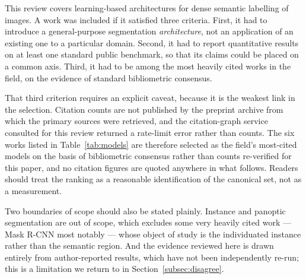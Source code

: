 \documentclass[journal]{IEEEtran}
\begin{document}
This review covers learning-based architectures for dense semantic labelling of
images. A work was included if it satisfied three criteria. First, it had to
introduce a general-purpose segmentation \emph{architecture}, not an application of
an existing one to a particular domain. Second, it had to report quantitative results
on at least one standard public benchmark, so that its claims could be placed on a
common axis. Third, it had to be among the most heavily cited works in the field, on
the evidence of standard bibliometric consensus.

That third criterion requires an explicit caveat, because it is the weakest link in
the selection. Citation counts are not published by the preprint archive from which
the primary sources were retrieved, and the citation-graph service consulted for this
review returned a rate-limit error rather than counts. The six works listed in
Table~\ref{tab:models} are therefore selected as the field's most-cited models on the
basis of bibliometric consensus rather than counts re-verified for this paper, and no
citation figures are quoted anywhere in what follows. Readers should treat the
ranking as a reasonable identification of the canonical set, not as a measurement.

Two boundaries of scope should also be stated plainly. Instance and panoptic
segmentation are out of scope, which excludes some very heavily cited work --- Mask
R-CNN most notably --- whose object of study is the individuated instance rather than
the semantic region. And the evidence reviewed here is drawn entirely from
author-reported results, which have not been independently re-run; this is a
limitation we return to in Section~\ref{subsec:disagree}.
\end{document}

